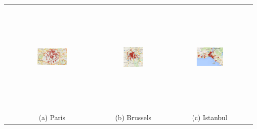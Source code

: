 \documentclass{acm_proc_article-sp}
\begin{document}
\begin{table}[!thb]
\centering
\begin{tabular}{ccc}
   \includegraphics[width=0.33\textwidth, height=5.5cm]{figuresPng/Paris.png}&  \includegraphics[width=0.33\textwidth, height=5.5cm]{figuresPng/Brussels.png} & \includegraphics[width=0.33\textwidth, height=5.5cm]{figuresPng/Istanbul.png}\\
   (a) Paris & (b) Brussels & (c) Istanbul\\
\end{tabular}
\label{fig:citiesDistribution}
\end{table}


\end{document}
